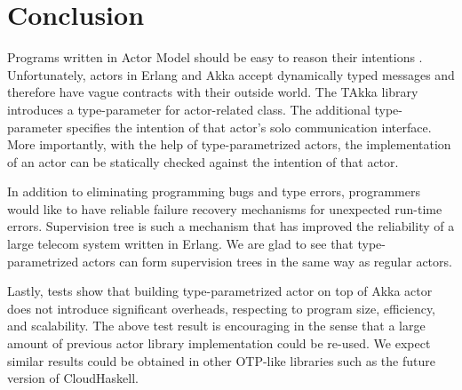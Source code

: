\documentclass[coverpage]{inftechrep}
\begin{document}
\section{Conclusion}

Programs written in Actor Model should be easy to reason their intentions
\cite{Hewitt:1973}.  Unfortunately, actors in Erlang and Akka accept
dynamically typed messages and therefore have vague contracts with their outside
world.  The TAkka library introduces a type-parameter for actor-related class.
The additional type-parameter specifies the intention of that actor's solo
communication interface. More importantly, with the help of type-parametrized
actors, the implementation of an actor can be statically checked against the
intention of that actor.

In addition to eliminating programming bugs and type errors, programmers would
like to have reliable failure recovery mechanisms for unexpected run-time
errors.  Supervision tree \cite{OTP} is such a mechanism that has improved the
reliability of a large telecom system written in Erlang.  We are glad to see
that type-parametrized actors can form supervision trees in the same way as
regular actors.

Lastly, tests show that building type-parametrized actor on top of Akka actor
does not introduce significant overheads, respecting to program size,
efficiency, and scalability.  The above test result is encouraging in the sense
that a large amount of previous actor library implementation could be re-used.
We expect similar results could be obtained in other OTP-like libraries such as
the future version of CloudHaskell.









\appendix
%
\end{document}
